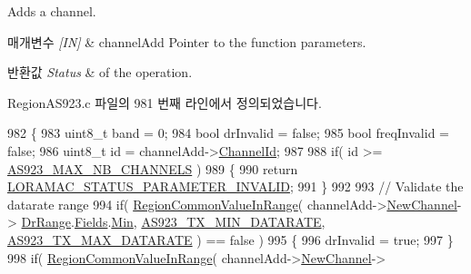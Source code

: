 Adds a channel. 


\begin{DoxyParams}{매개변수}
{\em \mbox{[}\+I\+N\mbox{]}} & channel\+Add Pointer to the function parameters.\\
\hline
\end{DoxyParams}

\begin{DoxyRetVals}{반환값}
{\em Status} & of the operation. \\
\hline
\end{DoxyRetVals}


Region\+A\+S923.\+c 파일의 981 번째 라인에서 정의되었습니다.


\begin{DoxyCode}
982 \{
983     uint8\_t band = 0;
984     \textcolor{keywordtype}{bool} drInvalid = \textcolor{keyword}{false};
985     \textcolor{keywordtype}{bool} freqInvalid = \textcolor{keyword}{false};
986     uint8\_t \textcolor{keywordtype}{id} = channelAdd->\mbox{\hyperlink{structs_channel_add_params_ae23f953dc29c360e56a3c856404a3276}{ChannelId}};
987 
988     \textcolor{keywordflow}{if}( \textcolor{keywordtype}{id} >= \mbox{\hyperlink{group___r_e_g_i_o_n_a_s923_ga02e3db7e4557dbf77db79285d38dc33e}{AS923\_MAX\_NB\_CHANNELS}} )
989     \{
990         \textcolor{keywordflow}{return} \mbox{\hyperlink{group___l_o_r_a_m_a_c_gga1d18f26b344040b3ec5c3db662919661ad0d3119f247d00e1787dda106fcb3017}{LORAMAC\_STATUS\_PARAMETER\_INVALID}};
991     \}
992 
993     \textcolor{comment}{// Validate the datarate range}
994     \textcolor{keywordflow}{if}( \mbox{\hyperlink{group___r_e_g_i_o_n_c_o_m_m_o_n_gafdd1c80d953e18d755a631b72a9c3bd3}{RegionCommonValueInRange}}( channelAdd->\mbox{\hyperlink{structs_channel_add_params_afc31493a105479490228fd896b20b45c}{NewChannel}}->
      \mbox{\hyperlink{structs_channel_params_ad4d9b041ea740886a05fa8a1d06997a2}{DrRange}}.\mbox{\hyperlink{unionu_dr_range_a5bdb9afc17112f2ae5f9548f0aee964f}{Fields}}.\mbox{\hyperlink{structu_dr_range_1_1s_fields_ad870086364c5eb410eec40e1025e3203}{Min}}, \mbox{\hyperlink{group___r_e_g_i_o_n_a_s923_gab6f2badbf9a4eb4038301759c0f7fc77}{AS923\_TX\_MIN\_DATARATE}}, 
      \mbox{\hyperlink{group___r_e_g_i_o_n_a_s923_gac9506097a516f03c7c86432d30e8f499}{AS923\_TX\_MAX\_DATARATE}} ) == \textcolor{keyword}{false} )
995     \{
996         drInvalid = \textcolor{keyword}{true};
997     \}
998     \textcolor{keywordflow}{if}( \mbox{\hyperlink{group___r_e_g_i_o_n_c_o_m_m_o_n_gafdd1c80d953e18d755a631b72a9c3bd3}{RegionCommonValueInRange}}( channelAdd->\mbox{\hyperlink{structs_channel_add_params_afc31493a105479490228fd896b20b45c}{NewChannel}}->

\end{DoxyCode}
